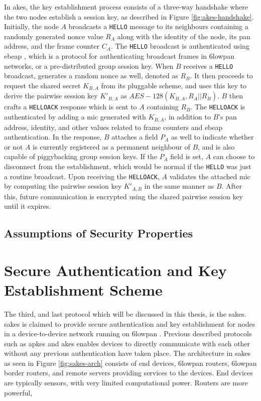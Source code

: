In \gls{akes}, the key establishment process consists of a three-way handshake where the two nodes establish a session key, as described in Figure \ref{fig:akes-handshake}. Initially, the node $A$ broadcasts a \texttt{HELLO} message to its neighbours containing a randomly generated nonce value $R_A$ along with the identity of the node, its \gls{pan} address, and the frame counter $C_A$. The \texttt{HELLO} broadcast is authenticated using \gls{ebeap} \cite{krentz20136lowpan}, which is a protocol for authenticating broadcast frames in \gls{6lowpan} networks, or a pre-distributed group session key. When $B$ receives a \texttt{HELLO} broadcast, generates a random nonce as well, denoted as $R_B$. It then proceeds to request the shared secret $K_{B,A}$ from its pluggable scheme, and uses this key to derive the pairwise session key $K'_{B,A}$ as $AES-128(K_{B,A}, R_A || R_B)$. $B$ then crafts a \texttt{HELLOACK} response which is sent to $A$ containing $R_B$. The \texttt{HELLOACK} is authenticated by adding a \gls{mic} generated with $K_{B,A}$, in addition to $B$'s \gls{pan} address, identity, and other values related to frame counters and \gls{ebeap} authentication. In the response, $B$ attaches a field $P_A$ as well to indicate whether or not $A$ is currently registered as a permanent neighbour of $B$, and is also capable of piggybacking group session keys. If the $P_A$ field is set, $A$ can choose to disconnect from the establishment, which would be normal if the \texttt{HELLO} was just a routine broadcast. Upon receiving the \texttt{HELLOACK}, $A$ validates the attached \gls{mic} by computing the pairwise session key $K'_{A, B}$ in the same manner as $B$. After this, future communication  is encrypted using the shared pairwise session key until it expires.


\subsection{Assumptions of Security Properties}






\section{Secure Authentication and Key Establishment Scheme}

The third, and last protocol which will be discussed in this thesis, is the \gls{sakes}. \gls{sakes} is claimed to provide secure authentication and key establishment for nodes in a device-to-device network running on \gls{6lowpan} \cite{hussen2013sakes}. Previous described protocols such as \gls{apkes} and \gls{akes} enables devices to directly communicate with each other without any previous authentication have taken place. The architecture in \gls{sakes} as seen in Figure \ref{fig:sakes-arch} consists of end devices, \gls{6lowpan} routers, \gls{6lowpan} border routers, and remote servers providing services to the devices. End devices are typically sensors, with very limited computational power. Routers are more powerful, 




